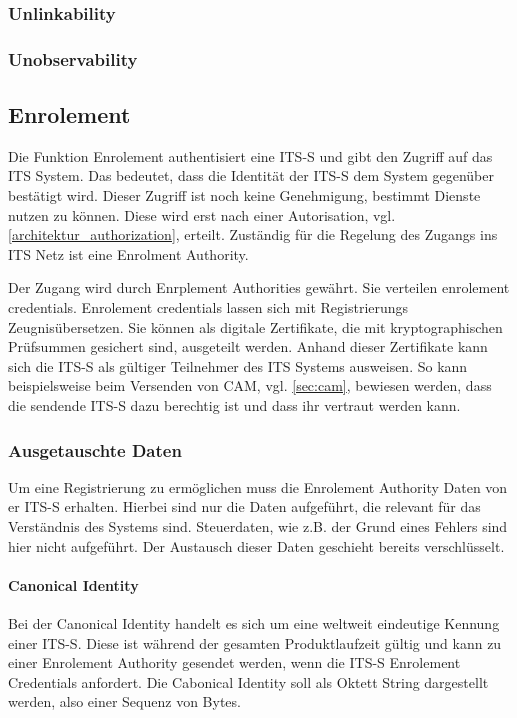 \subsubsection{Unlinkability}
\subsubsection{Unobservability}




\subsection{Enrolement \label{architektur_enrolement}}
Die Funktion Enrolement authentisiert eine \ac{ITS-S} und gibt den Zugriff auf das  \ac{ITS} System.  Das bedeutet, dass die Identität der \ac{ITS-S} dem System gegenüber bestätigt wird. Dieser Zugriff ist noch keine Genehmigung, bestimmt Dienste nutzen zu können. Diese wird erst nach einer Autorisation, vgl. \autoref{architektur_authorization}, erteilt. Zuständig für die Regelung des Zugangs ins \ac{ITS} Netz ist eine Enrolment Authority.

Der Zugang wird durch Enrplement Authorities gewährt. Sie verteilen  enrolement credentials. Enrolement credentials lassen sich mit \glqq Registrierungs Zeugnis\grqq übersetzen. Sie können als digitale Zertifikate, die  mit kryptographischen Prüfsummen gesichert sind, ausgeteilt werden. Anhand dieser Zertifikate kann sich die \ac{ITS-S} als gültiger Teilnehmer des \ac{ITS} Systems ausweisen. So kann beispielsweise beim Versenden von \ac{CAM}, vgl. \autoref{sec:cam}, bewiesen werden, dass die sendende \ac{ITS-S} dazu berechtig ist und dass ihr vertraut werden kann. 

\subsubsection{Ausgetauschte Daten}
Um eine Registrierung zu ermöglichen muss die Enrolement Authority Daten von er \ac{ITS-S} erhalten. Hierbei sind nur die Daten aufgeführt, die relevant für das Verständnis des Systems sind. Steuerdaten, wie z.B. der Grund eines Fehlers sind hier nicht aufgeführt. Der Austausch dieser Daten geschieht bereits verschlüsselt. 

\paragraph{Canonical Identity} Bei der Canonical Identity handelt es sich um eine weltweit eindeutige Kennung einer \ac{ITS-S}. Diese ist während der gesamten Produktlaufzeit gültig und kann zu einer Enrolement Authority gesendet werden, wenn die \ac{ITS-S} Enrolement Credentials anfordert. Die Cabonical Identity soll als Oktett String dargestellt werden, also einer Sequenz von Bytes.

